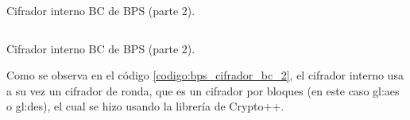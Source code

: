 \begin{listing}
  \inputminted[firstline=111, lastline=165]
    {c++}{../implementaciones/bps/cifrador_BC.cpp}
  \caption{Cifrador interno BC de  BPS (parte 2).}
  \label{codigo:bps_cifrador_bc_1}
\end{listing}

\begin{listing}
  \inputminted[firstline=165, lastline=218]
    {c++}{../implementaciones/bps/cifrador_BC.cpp}
  \caption{Cifrador interno BC de  BPS (parte 2).}
  \label{codigo:bps_cifrador_bc_2}
\end{listing}

Como se observa en el código \ref{codigo:bps_cifrador_bc_2}, el cifrador
interno usa a su vez un cifrador de ronda, que es un cifrador por bloques
(en este caso \gls{gl:aes} o \gls{gl:des}), el cual se hizo usando la
librería de Crypto++.
